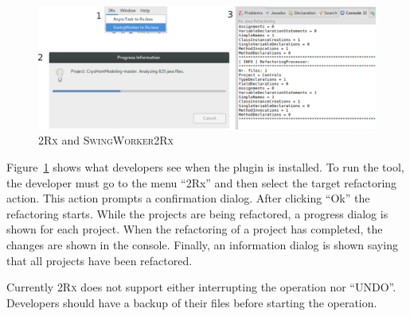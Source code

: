 \documentclass[type=bsc,accentcolor=tud9c]{tudthesis}
\newcommand{\toolcore}{\textsc{2Rx}}
\newcommand{\toolextension}{\textsc{SwingWorker2Rx}}
\begin{document}
\begin{figure}[H]
\begin{center}
\includegraphics[width=14cm]{design/tool-ui.png}
\end{center}
\caption{\toolcore{} and \toolextension{}}
\label{fig:tool-ui}
\end{figure}

Figure~\ref{fig:tool-ui} shows what developers see when the plugin is installed. To run the tool, the developer must go to the menu ``2Rx'' and then select the target refactoring action. This action prompts a confirmation dialog. After clicking ``Ok'' the refactoring starts. While the projects are being refactored, a progress dialog is shown for each project. When the refactoring of a project has completed, the changes are shown in the console. Finally, an information dialog is shown saying that all projects have been refactored.

Currently \toolcore{} does not support either interrupting the operation nor ``UNDO''. Developers should have a backup of their files before starting the operation.
\end{document}
